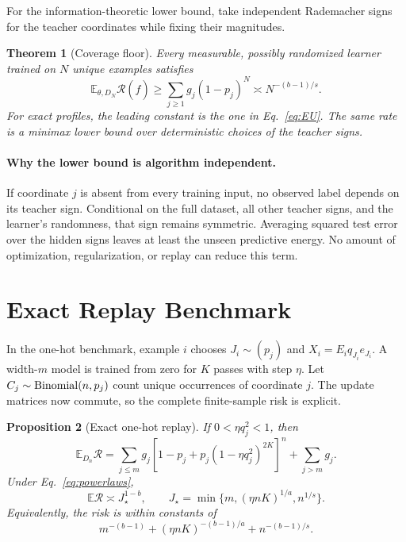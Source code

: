 \documentclass[letterpaper]{article}
\newtheorem{theorem}{Theorem}
\newtheorem{proposition}[theorem]{Proposition}
\newcommand{\E}{\mathbb E}
\newcommand{\R}{\mathcal R}
\begin{document}
For the information-theoretic lower bound, take independent Rademacher signs for
the teacher coordinates while fixing their magnitudes.

\begin{theorem}[Coverage floor]
\label{thm:coverage}
Every measurable, possibly randomized learner trained on $N$ unique examples
satisfies
\[
\E_{\theta,D_N}\R(\widehat f)
\ge \sum_{j\ge1}g_j(1-p_j)^N
\asymp N^{-(b-1)/s}.
\]
For exact profiles, the leading constant is the one in
Eq.~\eqref{eq:EU}. The same rate is a minimax lower bound over deterministic
choices of the teacher signs.
\end{theorem}

\paragraph{Why the lower bound is algorithm independent.}
If coordinate $j$ is absent from every training input, no observed label depends
on its teacher sign. Conditional on the full dataset, all other teacher signs,
and the learner's randomness, that sign remains symmetric. Averaging squared
test error over the hidden signs leaves at least the unseen predictive energy.
No amount of optimization, regularization, or replay can reduce this term.

\section{Exact Replay Benchmark}

In the one-hot benchmark, example $i$ chooses $J_i\sim(p_j)$ and
$X_i=E_iq_{J_i}e_{J_i}$. A width-$m$ model is trained from zero for $K$ passes
with step $\eta$. Let $C_j\sim{\rm Binomial}(n,p_j)$ count unique occurrences of
coordinate $j$. The update matrices now commute, so the complete finite-sample
risk is explicit.

\begin{proposition}[Exact one-hot replay]
\label{prop:onehot}
If $0<\eta q_j^2<1$, then
\begin{equation}
\E_{D_n}\R
=
\sum_{j\le m}g_j
[1-p_j+p_j(1-\eta q_j^2)^{2K}]^n
+\sum_{j>m}g_j.
\label{eq:onehot-exact}
\end{equation}
Under Eq.~\eqref{eq:powerlaws},
\begin{equation}
\E\R\asymp J_\star^{1-b},\qquad
J_\star=\min\{m,(\eta nK)^{1/a},n^{1/s}\}.
\label{eq:threefrontier}
\end{equation}
Equivalently, the risk is within constants of
\[
m^{-(b-1)}+(\eta nK)^{-(b-1)/a}+n^{-(b-1)/s}.
\]
\end{proposition}
\end{document}
